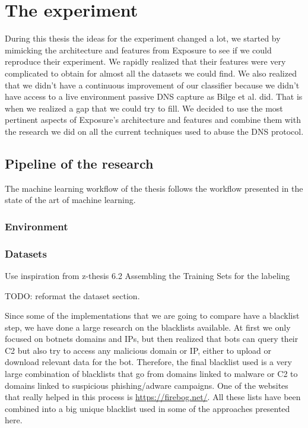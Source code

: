 
\chapter{The experiment} %
\label{experiment}

During this thesis the ideas for the experiment changed a lot, we started by mimicking the architecture and features from Exposure to see if we could reproduce their experiment. We rapidly realized that their features were very complicated to obtain for almost all the datasets we could find. We also realized that we didn't have a continuous improvement of our classifier because we didn't have access to a live environment passive DNS capture as Bilge et al. did. That is when we realized a gap that we could try to fill. We decided to use the most pertinent aspects of Exposure's architecture and features and combine them with the research we did on all the current techniques used to abuse the DNS protocol.
\section{Pipeline of the research}

The machine learning workflow of the thesis follows the workflow presented in the state of the art of machine learning.
\subsection{Environment}


\subsection{Datasets}

Use inspiration from z-thesis 6.2 Assembling the Training Sets for the labeling


TODO: reformat the dataset section.

Since some of the implementations that we are going to compare have a blacklist step, we have done a large research on the blacklists available. At first we only focused on botnets domains and IPs, but then realized that bots can query their C2 but also try to access any malicious domain or IP, either to upload or download relevant data for the bot. Therefore, the final blacklist used is a very large combination of blacklists that go from domains linked to malware or C2 to domains linked to suspicious phishing/adware campaigns. One of the websites that really helped in this process is \url{https://firebog.net/}. All these lists have been combined into a big unique blacklist used in some of the approaches presented here.\\\\

